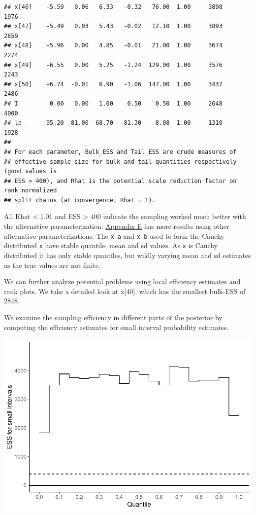 \documentclass[american,]{article}
\begin{document}
\begin{verbatim}
## x[46]    -5.59   0.06   6.33   -0.32   76.00  1.00     3898     1976
## x[47]    -5.49   0.03   5.43   -0.02   12.10  1.00     3893     2659
## x[48]    -5.96   0.00   4.85   -0.01   21.00  1.00     3674     2274
## x[49]    -6.55   0.00   5.25   -1.24  129.00  1.00     3576     2243
## x[50]    -6.74  -0.01   6.90   -1.06  147.00  1.00     3437     2486
## I         0.00   0.00   1.00    0.50    0.50  1.00     2648     4000
## lp__    -95.20 -81.00 -68.70  -81.30    8.08  1.00     1310     1928
## 
## For each parameter, Bulk_ESS and Tail_ESS are crude measures of 
## effective sample size for bulk and tail quantities respectively (good values is 
## ESS > 400), and Rhat is the potential scale reduction factor on rank normalized
## split chains (at convergence, Rhat = 1).
\end{verbatim}

All Rhat \textless{} 1.01 and ESS \textgreater{} 400 indicate the
sampling worked much better with the alternative parameterization.
\protect\hyperlink{AppendixE}{Appendix E} has more results using other
alternative parameterizations. The \texttt{x\_a} and \texttt{x\_b} used
to form the Cauchy distributed \texttt{x} have stable quantile, mean and
sd values. As \texttt{x} is Cauchy distributed it has only stable
quantiles, but wildly varying mean and sd estimates as the true values
are not finite.

We can further analyze potential problems using local efficiency
estimates and rank plots. We take a detailed look at x{[}40{]}, which
has the smallest bulk-ESS of 2848.

We examine the sampling efficiency in different parts of the posterior
by computing the efficiency estimates for small interval probability
estimates.

\includegraphics{graphics/local-ess-fit-alt1-1.pdf}
\end{document}
